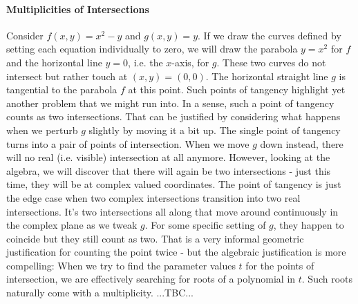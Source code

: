 \paragraph{Multiplicities of Intersections}
Consider $f(x,y) = x^2 - y$ and $g(x,y) = y$. If we draw the curves defined by setting each equation individually to zero, we will draw the parabola $y = x^2$ for $f$ and the horizontal line $y = 0$, i.e. the $x$-axis, for $g$. These two curves do not intersect but rather touch at $(x,y) = (0,0)$. The horizontal straight line $g$ is tangential to the parabola $f$ at this point. Such points of tangency highlight yet another problem that we might run into. In a sense, such a point of tangency counts as two intersections. That can be justified by considering what happens when we perturb $g$ slightly by moving it a bit up. The single point of tangency turns into a pair of points of intersection. When we move $g$ down instead, there will no real (i.e. visible) intersection at all anymore. However, looking at the algebra, we will discover that there will again be two intersections - just this time, they will be at complex valued coordinates. The point of tangency is just the edge case when two complex intersections transition into two real intersections. It's two intersections all along that move around continuously in the complex plane as we tweak $g$. For some specific setting of $g$, they happen to coincide but they still count as two. That is a very informal geometric justification for counting the point twice - but the algebraic justification is more compelling: When we try to find the parameter values $t$ for the points of intersection, we are effectively searching for roots of a polynomial in $t$. Such roots naturally come with a multiplicity. ...TBC...



